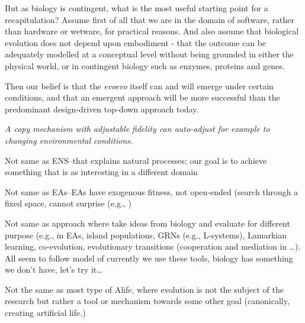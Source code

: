 But as biology is contingent, what is the most useful starting point for a recapitulation? Assume first of all that we are in the domain of software, rather than hardware or wetware, for practical reasons. And also assume that biological evolution does not depend upon embodiment - that the outcome can be adequately modelled at a conceptual level without being grounded in either the physical world, or in contingent biology such as enzymes, proteins and genes.

Then our belief is that the \emph{\gls{evoevo}} itself can and will emerge under certain conditions, and that an emergent approach will be more successful than the predominant design-driven top-down approach today.


\emph{A copy mechanism with adjustable fidelity can auto-adjust for example to changing environmental conditions.}

\begin{compactitem}
	\item
	      Not same as ENS--that explains natural processes; our goal is to achieve something that is as interesting in a different domain
	\item 
	      Not same as EAs--EAs have exogenous fitness, not open-ended (search through a fixed space, cannot surprise (e.g., \parencite{Nellis2014})
	\item  
	      Not same as approach where take ideas from biology and evaluate for different purpose (e.g., in EAs, island populations, GRNs (e.g., L-systems), Lamarkian learning, co-evolution, evolutionary transitions (cooperation and mediation in \parencite{Defaweux:2005fk}\ldots{}). All seem to follow model of currently we use these tools, biology has something we don't have, let's try it\ldots{}
	\item
	      Not the same as most type of Alife, where evolution is not the subject of the research but rather a tool or mechanism towards some other goal (canonically, creating artificial life.)
\end{compactitem}

